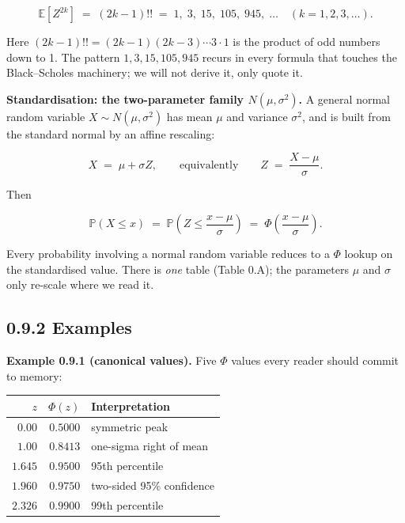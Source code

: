 \documentclass[
  10pt,
  twoside]{book}
\newcounter{none} %
\begin{document}
\[\mathbb{E}[Z^{2k}] \;=\; (2k - 1)!! \;=\; 1, \; 3, \; 15, \; 105, \; 945, \; \dots \quad (k = 1, 2, 3, \dots).\]

Here \((2k-1)!! = (2k-1)(2k-3)\cdots 3 \cdot 1\) is the product of odd
numbers down to 1. The pattern \(1, 3, 15, 105, 945\) recurs in every
formula that touches the Black--Scholes machinery; we will not derive
it, only quote it.

\textbf{Standardisation: the two-parameter family \(N(\mu, \sigma^2)\).}
A general normal random variable \(X \sim N(\mu, \sigma^2)\) has mean
\(\mu\) and variance \(\sigma^2\), and is built from the standard normal
by an affine rescaling:

\[X \;=\; \mu + \sigma Z, \qquad \text{equivalently} \qquad Z \;=\; \frac{X - \mu}{\sigma}.\]

Then

\[\mathbb{P}(X \leq x) \;=\; \mathbb{P}\!\left(Z \leq \frac{x - \mu}{\sigma}\right) \;=\; \Phi\!\left(\frac{x - \mu}{\sigma}\right).\]

Every probability involving a normal random variable reduces to a
\(\Phi\) lookup on the standardised value. There is \emph{one} table
(Table 0.A); the parameters \(\mu\) and \(\sigma\) only re-scale where
we read it.

\subsection{0.9.2 Examples}\label{examples-8}

\textbf{Example 0.9.1 (canonical values).} Five \(\Phi\) values every
reader should commit to memory:

{\def\LTcaptype{none} %
\begin{table}[H]
\centering
\begin{tabular}{|r|r|l|}
\toprule
\(z\) & \(\Phi(z)\) & Interpretation \\
\midrule



\(0.00\) & \(0.5000\) & symmetric peak \\
\(1.00\) & \(0.8413\) & one-sigma right of mean \\
\(1.645\) & \(0.9500\) & 95th percentile \\
\(1.960\) & \(0.9750\) & two-sided 95\% confidence \\
\(2.326\) & \(0.9900\) & 99th percentile \\
\bottomrule
\end{tabular}
\end{table}
}
\end{document}
